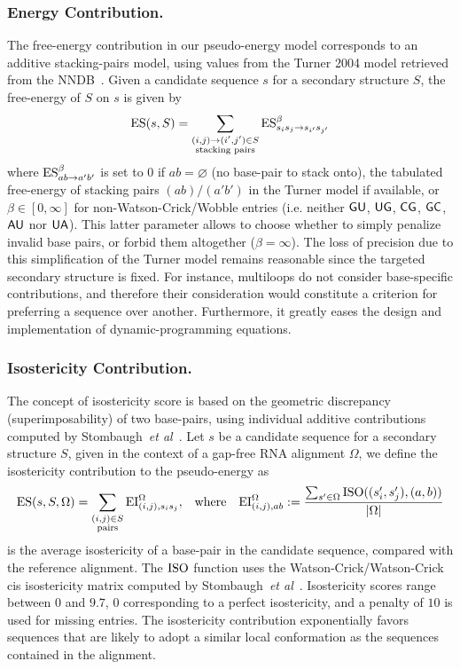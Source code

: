 \subsubsection{Energy Contribution.}
The free-energy contribution in our pseudo-energy model corresponds to an additive stacking-pairs model, using values from the Turner 2004 model retrieved from the NNDB~\citep{Turner2010}. Given a candidate sequence $s$ for a secondary structure $S$, the free-energy of $S$ on $s$ is given by
\begin{align*}
  \text{ES}(s,S) = \sum_{\substack{(i,j)\to (i',j')\in S\\ \text{stacking pairs}}}\text{ES}^{\beta}_{s_is_j\to s_{i'}s_{j'}} 
\end{align*}
where $\text{ES}^{\beta}_{ab\to a'b'}$ is set to $0$ if $ab=\varnothing$ (no base-pair to stack onto), the tabulated free-energy of stacking pairs $(ab)/(a'b')$ in the Turner model if available, or $\beta\in[0,\infty]$ for non-Watson-Crick/Wobble entries (i.e. neither ${\sf{G}}{\sf{U}}$, ${\sf{U}}{\sf{G}}$, ${\sf{C}}{\sf{G}}$, ${\sf{G}}{\sf{C}}$, ${\sf{A}}{\sf{U}}$ nor ${\sf{U}}{\sf{A}}$). This latter parameter allows to choose whether to simply penalize invalid base pairs, or forbid them altogether ($\beta = \infty$).
The loss of precision due to this simplification of the Turner model remains reasonable since the targeted secondary structure is fixed. For instance, multiloops do not consider base-specific contributions, and therefore their consideration would constitute a criterion for preferring a sequence over another. Furthermore, it greatly eases the design and implementation of dynamic-programming equations. 
\subsubsection{Isostericity Contribution.}
The concept of isostericity score is based on the geometric discrepancy (superimposability) of two base-pairs, using individual additive contributions computed by Stombaugh~\emph{et al}~\citep{Stombaugh2009}. Let $s$ be a candidate sequence for a secondary structure $S$, given in the context of a gap-free RNA alignment $\Omega$,  we define the isostericity contribution to the pseudo-energy as
\begin{align*}
  \text{ES}(s,S,\Omega) &= \sum_{\substack{(i,j)\in S\\ \text{pairs}}}\text{EI}^{\Omega}_{(i,j),s_i s_j}, & \text{where}&& 	\text{EI}^{\Omega}_{(i,j),ab}:=
	\frac{
		\sum_{s'\in\Omega}
			\text{\text{ISO}}((s_i',s_j'),(a,b))}
{		
		|\Omega|
	}
\end{align*}
is the average isostericity of a base-pair in the candidate sequence, compared with the reference alignment.
The $\text{ISO}$ function uses the {Watson-Crick/Watson-Crick} cis isostericity matrix computed by Stombaugh~\emph{et al}~\citep{Stombaugh2009}. Isostericity scores range between $0$ and $9.7$, $0$ corresponding to a perfect isostericity, and a penalty of $10$ is used for missing entries.
The isostericity contribution exponentially favors sequences that are likely to adopt a similar local conformation as the sequences contained in the alignment.

